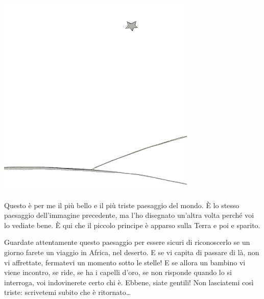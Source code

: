 \documentclass[11pt]{scrbook}
\begin{document}
\begin{center}
\includegraphics{img/27a}
\end{center}

Questo è per me il più bello e il più triste paesaggio del mondo. È lo stesso paesaggio dell'immagine precedente, ma l'ho disegnato un'altra volta perché voi lo vediate bene. È qui che il piccolo principe è apparso sulla Terra e poi e sparito.

Guardate attentamente questo paesaggio per essere sicuri di riconoscerlo se un giorno farete un viaggio in Africa, nel deserto. E se vi capita di passare di là, non vi affrettate, fermatevi un momento sotto le stelle! E se allora un bambino vi viene incontro, se ride, se ha i capelli d'oro, se non risponde quando lo si interroga, voi indovinerete certo chi è. Ebbene, siate gentili! Non lasciatemi così triste: scrivetemi subito che è ritornato\ldots{}
\end{document}
